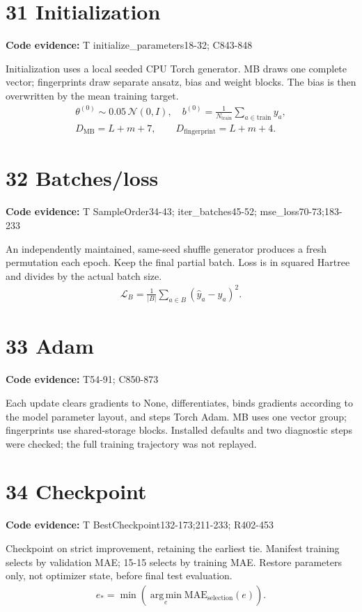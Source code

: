 \documentclass[10pt,a4paper]{article}
\newcommand{\stage}[2]{\section*{#1}\textbf{Code evidence:} #2\par}
\begin{document}
\par\noindent\begin{minipage}{\linewidth}
\stage{31 Initialization}{T initialize\_parameters18-32; C843-848}
Initialization uses a local seeded CPU Torch generator. MB draws one complete vector; fingerprints draw separate ansatz, bias and weight blocks. The bias is then overwritten by the mean training target.
\[
\begin{gathered}
\theta^{(0)}\sim0.05\,\mathcal N(0,I),\quad b^{(0)}=\frac1{N_{\mathrm{train}}}\sum_{a\in\mathrm{train}}y_a,\\ D_{\mathrm{MB}}=L+m+7,\qquad D_{\mathrm{fingerprint}}=L+m+4.
\end{gathered}
\]
\end{minipage}\par\vspace{4pt}
\par\noindent\begin{minipage}{\linewidth}
\stage{32 Batches/loss}{T SampleOrder34-43; iter\_batches45-52; mse\_loss70-73;183-233}
An independently maintained, same-seed shuffle generator produces a fresh permutation each epoch. Keep the final partial batch. Loss is in squared Hartree and divides by the actual batch size.
\[
\begin{gathered}
\mathcal L_B=\frac1{|B|}\sum_{a\in B}(\widehat y_a-y_a)^2.
\end{gathered}
\]
\end{minipage}\par\vspace{4pt}
\par\noindent\begin{minipage}{\linewidth}
\stage{33 Adam}{T54-91; C850-873}
Each update clears gradients to None, differentiates, binds gradients according to the model parameter layout, and steps Torch Adam. MB uses one vector group; fingerprints use shared-storage blocks. Installed defaults and two diagnostic steps were checked; the full training trajectory was not replayed.
\end{minipage}\par\vspace{4pt}
\par\noindent\begin{minipage}{\linewidth}
\stage{34 Checkpoint}{T BestCheckpoint132-173;211-233; R402-453}
Checkpoint on strict improvement, retaining the earliest tie. Manifest training selects by validation MAE; 15-15 selects by training MAE. Restore parameters only, not optimizer state, before final test evaluation.
\[
\begin{gathered}
e_* = \min\!\left(\operatorname*{arg\,min}_{e}\mathrm{MAE}_{\mathrm{selection}}(e)\right).
\end{gathered}
\]
\end{minipage}\par\vspace{4pt}
\end{document}
